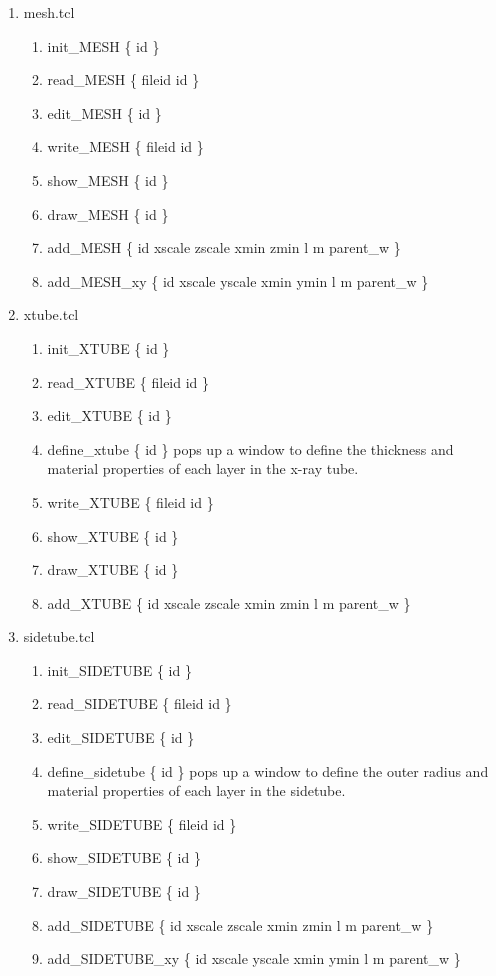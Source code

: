 \documentclass[12pt]{book}
\begin{document}
\begin{enumerate}
\item mesh.tcl
\begin{enumerate}
\item {\sf init\_MESH \{ id \}}
\item {\sf read\_MESH \{ fileid id \}}
\item {\sf edit\_MESH \{ id \}}
\item {\sf write\_MESH \{ fileid id \}}
\item {\sf show\_MESH \{ id \}}
\item {\sf draw\_MESH \{ id \}}
\item {\sf add\_MESH \{ id xscale zscale xmin zmin l m parent\_w \}}
\item {\sf add\_MESH\_xy \{ id xscale yscale xmin ymin l m parent\_w \}}
\end{enumerate}

\item xtube.tcl
\begin{enumerate}
\item {\sf init\_XTUBE \{ id \}}
\item {\sf read\_XTUBE \{ fileid id \}}
\item {\sf edit\_XTUBE \{ id \}}
\item {\sf define\_xtube \{ id \}} pops up a window to define the
thickness and material properties of each layer in the x-ray tube.
\item {\sf write\_XTUBE \{ fileid id \}}
\item {\sf show\_XTUBE \{ id \}}
\item {\sf draw\_XTUBE \{ id \}}
\item {\sf add\_XTUBE \{ id xscale zscale xmin zmin l m parent\_w \}}
\end{enumerate}

\item sidetube.tcl
\begin{enumerate}
\item {\sf init\_SIDETUBE \{ id \}}
\item {\sf read\_SIDETUBE \{ fileid id \}}
\item {\sf edit\_SIDETUBE \{ id \}}
\item {\sf define\_sidetube \{ id \}} pops up a window to define the
outer radius and material properties of each layer in the sidetube.
\item {\sf write\_SIDETUBE \{ fileid id \}}
\item {\sf show\_SIDETUBE \{ id \}}
\item {\sf draw\_SIDETUBE \{ id \}}
\item {\sf add\_SIDETUBE \{ id xscale zscale xmin zmin l m parent\_w \}}
\item {\sf add\_SIDETUBE\_xy \{ id xscale yscale xmin ymin l m parent\_w \}}
\end{enumerate}


\end{enumerate}
\end{document}
